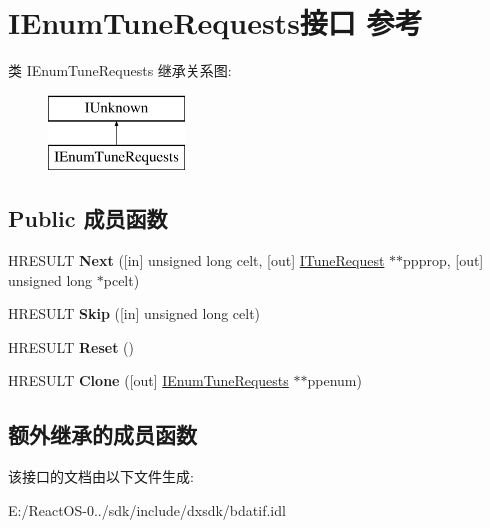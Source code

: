\hypertarget{interface_i_enum_tune_requests}{}\section{I\+Enum\+Tune\+Requests接口 参考}
\label{interface_i_enum_tune_requests}
类 I\+Enum\+Tune\+Requests 继承关系图\+:\begin{figure}[H]
\begin{center}
\leavevmode
\includegraphics[height=2.000000cm]{interface_i_enum_tune_requests}
\end{center}
\end{figure}
\subsection*{Public 成员函数}
\begin{DoxyCompactItemize}
\item 
\mbox{\label{interface_i_enum_tune_requests_a1dc9732546bb89a06fca312e70d8a631}} 
H\+R\+E\+S\+U\+LT {\bfseries Next} (\mbox{[}in\mbox{]} unsigned long celt, \mbox{[}out\mbox{]} \hyperlink{interface_i_tune_request}{I\+Tune\+Request} $\ast$$\ast$ppprop, \mbox{[}out\mbox{]} unsigned long $\ast$pcelt)
\item 
\mbox{\label{interface_i_enum_tune_requests_a86620c9deb4f1d326d8016758631e060}} 
H\+R\+E\+S\+U\+LT {\bfseries Skip} (\mbox{[}in\mbox{]} unsigned long celt)
\item 
\mbox{\label{interface_i_enum_tune_requests_a04c7b668813700acb9b0df5aa37070a0}} 
H\+R\+E\+S\+U\+LT {\bfseries Reset} ()
\item 
\mbox{\label{interface_i_enum_tune_requests_ae4ea1df9b0fe0548e75a1948d5088362}} 
H\+R\+E\+S\+U\+LT {\bfseries Clone} (\mbox{[}out\mbox{]} \hyperlink{interface_i_enum_tune_requests}{I\+Enum\+Tune\+Requests} $\ast$$\ast$ppenum)
\end{DoxyCompactItemize}
\subsection*{额外继承的成员函数}


该接口的文档由以下文件生成\+:\begin{DoxyCompactItemize}
\item 
E\+:/\+React\+O\+S-\/0../sdk/include/dxsdk/bdatif.\+idl\end{DoxyCompactItemize}
